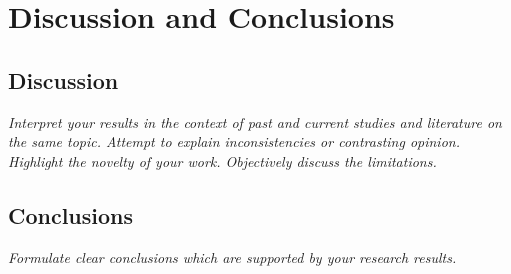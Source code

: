 %
%
%

\chapter{Discussion and Conclusions}

\section{Discussion}

\textit{Interpret your results in the context of past and current studies and literature on the same topic. Attempt to explain inconsistencies or contrasting opinion. Highlight the novelty of your work. Objectively discuss the limitations.}

\section{Conclusions}

\textit{Formulate clear conclusions which are supported by your research results.}

\endinput